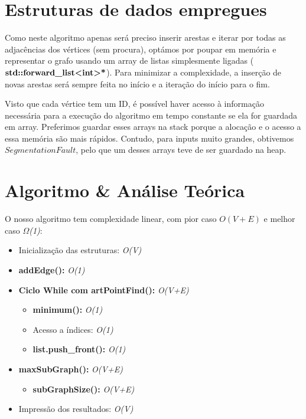 \documentclass[12pt]{article}
\begin{document}
\section{Estruturas de dados empregues}
    \par
    Como neste algoritmo apenas será preciso inserir arestas e iterar por todas as 
    adjacências dos vértices (sem procura), optámos por poupar em memória e representar o 
    grafo usando um array de listas simplesmente ligadas ($\textbf{std::forward\_list\textless int\textgreater*}$). 
    Para minimizar a complexidade, a inserção de novas arestas será sempre feita no início e a 
    iteração do início para o fim.
    \par
    Visto que cada vértice tem um ID, é possível haver acesso à informação necessária para a 
    execução do algoritmo em tempo constante se ela for guardada em array. Preferimos guardar 
    esses arrays na stack porque a alocação e o acesso a essa memória são mais rápidos. 
    Contudo, para inputs muito grandes, obtivemos $Segmentation Fault$, pelo que um desses 
    arrays teve de ser guardado na heap.
    
\section{Algoritmo \& Análise Teórica} 
    O nosso algoritmo tem complexidade linear, com pior caso \textit{$O(V+E)$} 
    e melhor caso \textit{$\Omega$(1)}:
    \begin{itemize}
        \item Inicialização das estruturas: \textit{O(V)}
        \item \textbf{addEdge():} \textit{O(1)}
        \item \textbf{Ciclo While com artPointFind():} \textit{O(V+E)}
        \begin{itemize}
            \item \textbf{minimum():} \textit{O(1)}
            \item Acesso a índices: \textit{O(1)}
            \item \textbf{list.push\_front():} \textit{O(1)}
        \end{itemize}
        \item \textbf{maxSubGraph():} \textit{O(V+E)}
        \begin{itemize}
            \item \textbf{subGraphSize():} \textit{O(V+E)}
        \end{itemize}
        \item Impressão dos resultados: \textit{O(V)}
    \end{itemize}
\end{document}
